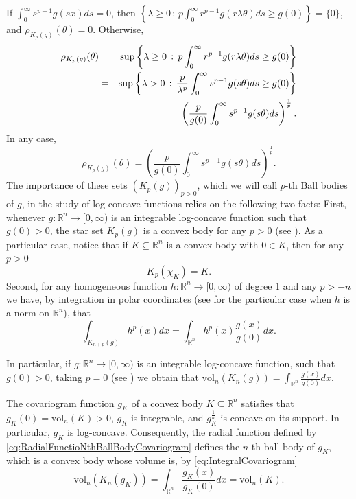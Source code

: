 \documentclass[10pt]{amsart}
\def\R{\mathbb{R}}
\def\vol{\mathrm{vol}}
\numberwithin{equation}{section}
\begin{document}
If $\displaystyle{\int_0^\infty s^{p-1}g(sx)ds=0}$, then $\left\{\lambda\geq0\,:\,p\int_0^\infty r^{p-1}g(r\lambda\theta)ds\geq g(0)\right\}=\{0\}$, and $\rho_{K_p(g)}(\theta)=0$. Otherwise,
\begin{eqnarray*}
\rho_{K_p(g)}(\theta)&=&\sup\left\{\lambda\geq0\,:\,p\int_0^\infty r^{p-1}g(r\lambda\theta)ds\geq g(0)\right\}\cr
&=&\sup\left\{\lambda>0\,:\,\frac{p}{\lambda^p}\int_0^\infty s^{p-1}g(s\theta)ds\geq g(0)\right\}\cr
&=&\left(\frac{p}{g(0)}\int_0^\infty s^{p-1}g(s\theta)ds\right)^\frac{1}{p}.
\end{eqnarray*}
In any case,
\begin{equation}\label{eq:RadialFunctionp-BallBodies}
\rho_{K_p(g)}(\theta)=\left(\frac{p}{g(0)}\int_0^\infty s^{p-1}g(s\theta)ds\right)^\frac{1}{p}.
\end{equation}
The importance of these sets $(K_p(g))_{p>0}$, which we will call $p$-th Ball bodies of $g$, in the study of log-concave functions relies on the following two facts: First, whenever $g:\R^n\to[0,\infty)$ is an integrable log-concave function such that $g(0)>0$, the star set $K_p(g)$ is a convex body for any $p>0$ (see \cite[Theorem 2.5.5, Lemma 2.5.6, and Proposition 2.5.7]{BGVV}). As a particular case, notice that if $K\subseteq\R^n$ is a convex body with $0\in K$, then for any $p>0$
\begin{equation}\label{eq:BallBodiesCharacteristicFunctions}
K_p(\chi_K)=K.
\end{equation}
Second, for any homogeneous function $h:\R^n\to[0,\infty)$ of degree 1 and any $p>-n$ we have, by integration in polar coordinates (see \cite[Proposition 2.5.3]{BGVV} for the particular case when $h$ is a norm on $\R^n$), that
$$
\int_{K_{n+p}(g)}h^p(x)dx=\int_{\R^n}h^p(x)\frac{g(x)}{g(0)}dx.
$$

In particular, if $g:\R^n\to[0,\infty)$ is an integrable log-concave function, such that $g(0)>0$, taking $p=0$ (see \cite[Lemma 2.5.6]{BGVV}) we obtain that  $\displaystyle{\vol_n(K_n(g))=\int_{\R^n}\frac{g(x)}{g(0)}dx}$.

The covariogram function $g_K$ of  a convex body $K\subseteq\R^n$ satisfies that $g_K(0)=\vol_n(K)>0$, $g_K$ is integrable, and $g_K^\frac{1}{n}$ is concave on its support. In particular, $g_K$ is log-concave. Consequently, the radial function defined by \eqref{eq:RadialFunctioNthBallBodyCovariogram} defines the $n$-th ball body of $g_K$, which is a convex body whose volume is, by \eqref{eq:IntegralCovariogram}
\begin{equation}\label{eq:VolumeNthBallBodyCovariogram}
\vol_n(K_n(g_K))=\int_{\R^n}\frac{g_K(x)}{g_K(0)}dx=\vol_n(K).
\end{equation}
\end{document}
